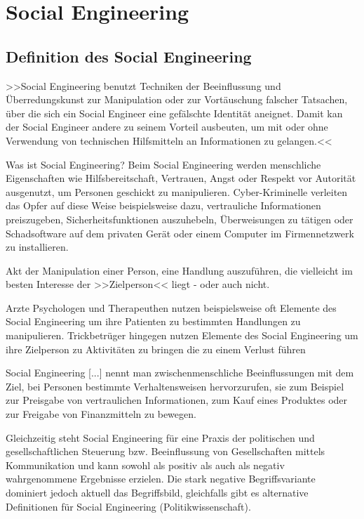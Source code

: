 \chapter{Social Engineering}\label{ch:SocialEngineering}

\section{Definition des Social Engineering}

>>Social Engineering benutzt Techniken der Beeinflussung und Überredungskunst zur Manipulation oder zur Vortäuschung falscher Tatsachen, über die sich ein Social Engineer eine gefälschte Identität aneignet. Damit kan der Social Engineer andere zu seinem Vorteil ausbeuten, um mit oder ohne Verwendung von technischen Hilfsmitteln an Informationen zu gelangen.<<\cite{mitn}

Was ist Social Engineering?
Beim Social Engineering werden menschliche Eigenschaften wie Hilfsbereitschaft, Vertrauen, Angst oder Respekt vor Autorität ausgenutzt, um Personen geschickt zu manipulieren. Cyber-Kriminelle verleiten das Opfer auf diese Weise beispielsweise dazu, vertrauliche Informationen preiszugeben, Sicherheitsfunktionen auszuhebeln, Überweisungen zu tätigen oder Schadsoftware auf dem privaten Gerät oder einem Computer im Firmennetzwerk zu installieren.\cite{bsi}

Akt der Manipulation einer Person, eine Handlung auszuführen, die vielleicht im besten Interesse der >>Zielperson<< liegt - oder auch nicht.\cite{Hadn1}

Arzte Psychologen und Therapeuthen nutzen beispielsweise oft Elemente des Social Engineering um ihre Patienten zu bestimmten Handlungen zu manipulieren. Trickbetrüger hingegen nutzen Elemente des Social Engineering um ihre Zielperson zu Aktivitäten zu bringen die zu einem Verlust führen \cite{Hadn1}

Social Engineering [...] nennt man zwischenmenschliche Beeinflussungen mit dem Ziel, bei Personen bestimmte Verhaltensweisen hervorzurufen, sie zum Beispiel zur Preisgabe von vertraulichen Informationen, zum Kauf eines Produktes oder zur Freigabe von Finanzmitteln zu bewegen.

Gleichzeitig steht Social Engineering für eine Praxis der politischen und gesellschaftlichen Steuerung bzw. Beeinflussung von Gesellschaften mittels Kommunikation und kann sowohl als positiv als auch als negativ wahrgenommene Ergebnisse erzielen. Die stark negative Begriffsvariante dominiert jedoch aktuell das Begriffsbild, gleichfalls gibt es alternative Definitionen für Social Engineering (Politikwissenschaft).\cite{test}

